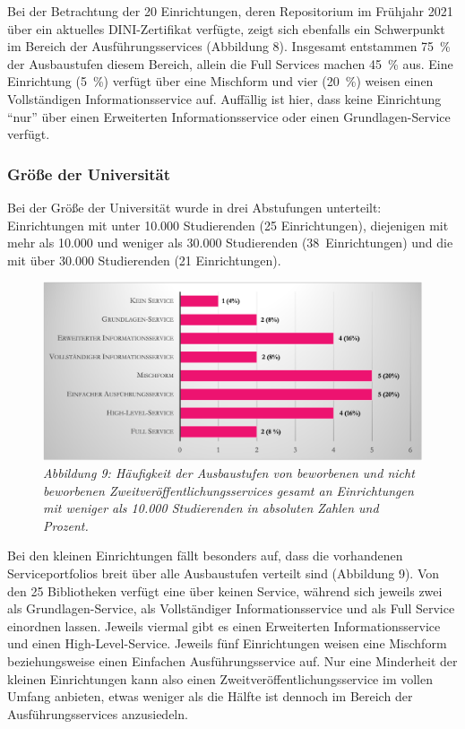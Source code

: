 \documentclass[a4paper,
fontsize=11pt,
oneside,
numbers=noperiodatend,
parskip=half-,
bibliography=totoc,
final
]{scrartcl}
\begin{document}
Bei der Betrachtung der 20 Einrichtungen, deren Repositorium im Frühjahr
2021 über ein aktuelles DINI-Zertifikat verfügte, zeigt sich ebenfalls
ein Schwerpunkt im Bereich der Ausführungsservices (Abbildung 8).
Insgesamt entstammen 75~\% der Ausbaustufen diesem Bereich, allein die
Full Services machen 45~\% aus. Eine Einrichtung (5~\%) verfügt über
eine Mischform und vier (20~\%) weisen einen Vollständigen
Informationsservice auf. Auffällig ist hier, dass keine Einrichtung
\enquote{nur} über einen Erweiterten Informationsservice oder einen
Grundlagen-Service verfügt.

\hypertarget{gruxf6uxdfe-der-universituxe4t}{%
\subsubsection{Größe der
Universität}\label{gruxf6uxdfe-der-universituxe4t}}

Bei der Größe der Universität wurde in drei Abstufungen unterteilt:
Einrichtungen mit unter 10.000 Studierenden (25 Einrichtungen),
diejenigen mit mehr als 10.000 und weniger als 30.000 Studierenden
(38~Einrichtungen) und die mit über 30.000 Studierenden (21
Einrichtungen).

\begin{figure}[h!]
\centering
\includegraphics[width=.9\textwidth]{img/abb9.png}
\caption{\textit{Abbildung 9: Häufigkeit der Ausbaustufen von beworbenen und
nicht beworbenen Zweitveröffentlichungsservices gesamt an Einrichtungen
mit weniger als 10.000 Studierenden in absoluten Zahlen und Prozent.}}
\end{figure}

Bei den kleinen Einrichtungen fällt besonders auf, dass die vorhandenen
Serviceportfolios breit über alle Ausbaustufen verteilt sind (Abbildung
9). Von den 25 Bibliotheken verfügt eine über keinen Service, während
sich jeweils zwei als Grundlagen-Service, als Vollständiger
Informationsservice und als Full Service einordnen lassen. Jeweils
viermal gibt es einen Erweiterten Informationsservice und einen
High-Level-Service. Jeweils fünf Einrichtungen weisen eine Mischform
beziehungsweise einen Einfachen Ausführungsservice auf. Nur eine
Minderheit der kleinen Einrichtungen kann also einen
Zweitveröffentlichungsservice im vollen Umfang anbieten, etwas weniger
als die Hälfte ist dennoch im Bereich der Ausführungsservices
anzusiedeln.
\end{document}
